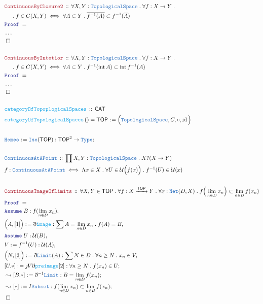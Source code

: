 \documentclass[12pt]{scrartcl}
\newcommand{\TYPE}[1]{\textcolor{NavyBlue}{\mathtt{#1}}}
\newcommand{\FUNC}[1]{\textcolor{Cerulean}{\mathtt{#1}}}
\newcommand{\LOGIC}[1]{\textcolor{Blue}{\mathtt{#1}}}
\newcommand{\THM}[1]{\textcolor{Maroon}{\mathtt{#1}}}
\renewcommand{\.}{\; . \;}
\newcommand{\de}{: \kern 0.1pc =}
\newcommand{\Act}[1]{\left( #1 \right)}
\newcommand{\Theorem}[2]{& \THM{#1} \, :: \, #2 \\ & \Proof = \\ }
\newcommand{\DeclareType}[2]{& \TYPE{#1} \, :: \, #2 \\}
\newcommand{\DefineType}[3]{& #1 : \TYPE{#2} \iff #3 \\}
\newcommand{\DeclareFunc}[2]{& \FUNC{#1} \, :: \, #2 \\}
\newcommand{\DefineNamedFunc}[4]{&  \FUNC{#1}\Act{#2} = #3 \de #4 \\}
\newcommand{\NewLine}{\\ & \kern 1pc}
\newcommand{\Page}[1]{ \begin{align*} #1 \end{align*}   }
\newcommand{ \bd }{ \ByDef }
\newcommand{\NoProof}{ & \ldots \\ \EndProof}
\newcommand{\Type}{\TYPE{Type}}
\DeclareMathOperator*{\id}{id}
\newcommand{\Arrow}{\xrightarrow}
\newcommand{\Say}[3]{& #1 \de #2 : #3, \\}
\newcommand{\Conclude}[3]{& #1 \de #2 : #3; \\}
\newcommand{\DeriveConclude}[3]{& \leadsto #1 \de #2 : #3 ; \\}
\newcommand{\Assume}[2]{& \LOGIC{Assume} \; #1 : #2, \\}
\newcommand{\QED}{\; \square}
\newcommand{\EndProof}{& \QED \\}
\newcommand{\ByDef}{\eth}
\newcommand{\ByConstr}{\jmath}
\newcommand{\Proof}{\LOGIC{Proof} \; }
\newcommand{\CAT}{\mathsf{CAT}}
\newcommand{\TS}{\TYPE{TopologicalSpace}}
\DeclareMathOperator*{\intx}{int}
\newcommand{\TOP}{\mathsf{TOP}}
\newcommand{\U}{\mathcal{U}}
\begin{document}
\Page{
	\Theorem{ContinuousByClosure2}
	{
		\forall X,Y : \TS \.
		\forall f : X \to Y \.
		\NewLine \.
		f \in C(X,Y) \iff
		\forall A \subset Y \. 
		\overline{f^{-1}(A)} \subset f^{-1}(\overline{A})
	}
	\NoProof
	\\
	\Theorem{ContinuousByIntetior}
	{
		\forall X,Y : \TS \.
		\forall f : X \to Y \.
		\NewLine \.
		f \in C(X,Y) \iff
		\forall A \subset Y \. 
		f^{-1}( \intx A) \subset \intx f^{-1}(A)
	}
	\NoProof
	\\
	\DeclareFunc{categoryOfTopoplogicalSpaces}{\CAT}
	\DefineNamedFunc{categoryOfTopologicalSpaces}
	{  }{\TOP}{\Big( \TS, C,\circ,\id\Big)}
	\\
	\Conclude{\TYPE{Homeo}}{\TYPE{Iso}(\TOP)}{\TOP^2 \to \Type}
	\\
	\DeclareType{ContinuousAtAPoint}
	{ \prod X,Y : \TS \. X  ?(X \to Y) }
	\DefineType{f}{ContinuousAtAPoint}
	{
		\Lambda x \in X \. \forall U \in \U\Big(f(x)\Big) \.
		f^{-1}(U) \in \U(x)
	}
	\\
	\Theorem{ContinuousImageOfLimits}
	{
		\forall X,Y \in \TOP \.
		\forall f : X \Arrow{\TOP} Y \.
		\forall x : \TYPE{Net}(D,X) \.
		f\Big( \lim_{n \in D}  x_n\Big) \subset
		\lim_{n \in D } f(x_n)
	}
	\Assume{B}{f(\lim_{n \in D} x_n)}
	\Say{\Big(A,[1]\Big)}{\bd \FUNC{image}}
	{
		\sum A = \lim_{n \in D} x_n\. f(A) = B
	}
	\Assume{U}{\U(B)}
	\Say{V}{f^{-1}(U)}{\U(A)}
	\Say{\Big(N,[2]\Big)}
	{
		\bd \TYPE{Limit}(A)
	}
	{
		\sum N \in D \. \forall n \ge N \. x_n \in V
	}
	\Conclude{[U.*]}{\ByConstr V \bd \FUNC{preimage}[2]}
	{
		\forall n \ge N \. f(x_n) \in U
	}
	\DeriveConclude{[B.*]}{\bd^{-1}\TYPE{Limit}}
	{
		B = \lim_{n \in D} f(x_n)
	}
	\DeriveConclude{[*]}{I\TYPE{Subset}}
	{
		f(\lim_{n \in D} x_n) \subset \lim_{n \in D} f(x_n)
	}
	\EndProof
}
\end{document}
